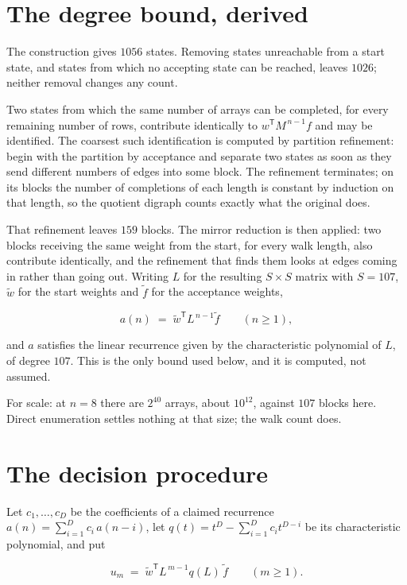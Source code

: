 \documentclass[11pt]{article}
\theoremstyle{definition}
\begin{document}
\section{The degree bound, derived}

The construction gives $1056$ states. Removing states unreachable from a start state, and states from which no accepting state can be reached, leaves $1026$; neither removal changes any count.

Two states from which the same number of arrays can be completed, for every remaining number of rows, contribute identically to $w^{\mathsf T}M^{\,n-1}f$ and may be identified. The coarsest such identification is computed by partition refinement: begin with the partition by acceptance and separate two states as soon as they send different numbers of edges into some block. The refinement terminates; on its blocks the number of completions of each length is constant by induction on that length, so the quotient digraph counts exactly what the original does.

That refinement leaves $159$ blocks. The mirror reduction is then applied: two blocks receiving the same weight from the start, for every walk length, also contribute identically, and the refinement that finds them looks at edges coming in rather than going out. Writing $L$ for the resulting $S \times S$ matrix with $S = 107$, $\tilde w$ for the start weights and $\tilde f$ for the acceptance weights,

\[a(n) \;=\; \tilde w^{\mathsf T} L^{\,n-1} \tilde f \qquad (n \ge 1),\]

and $a$ satisfies the linear recurrence given by the characteristic polynomial of $L$, of degree $107$. This is the only bound used below, and it is computed, not assumed.

For scale: at $n = 8$ there are $2^{40}$ arrays, about $10^{12}$, against $107$ blocks here. Direct enumeration settles nothing at that size; the walk count does.

\section{The decision procedure}

Let $c_1,\dots,c_D$ be the coefficients of a claimed recurrence $a(n) = \sum_{i=1}^{D} c_i\,a(n-i)$, let $q(t) = t^{D} - \sum_{i=1}^{D} c_i t^{D-i}$ be its characteristic polynomial, and put

\[u_m \;=\; \tilde w^{\mathsf T} L^{\,m-1} q(L)\,\tilde f \qquad (m \ge 1).\]
\end{document}
